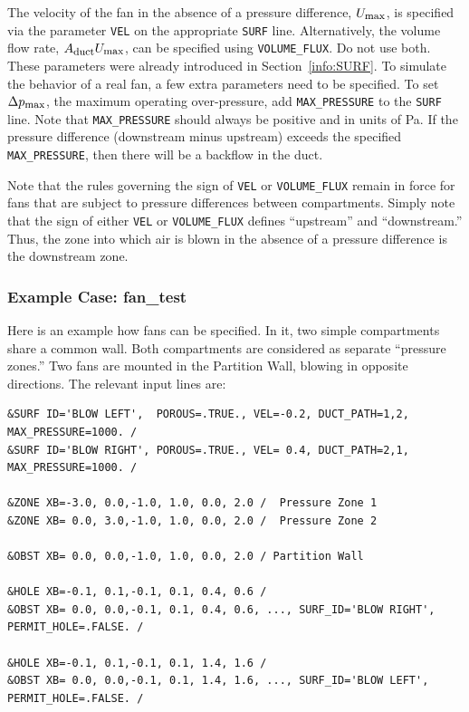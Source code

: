 \documentclass[11pt]{book}
\newcommand{\ct}{\tt\small}
\begin{document}
The velocity of the fan in the absence of a pressure difference, $U_{\hbox{\footnotesize max}}$, is
specified via the parameter {\ct VEL} on the appropriate {\ct SURF}
line. Alternatively, the volume flow rate, $A_{\hbox{\footnotesize duct}} U_{\hbox{\footnotesize max}}$, can be specified using {\ct VOLUME\_FLUX}.
Do not use both.  These parameters were already
introduced in Section~\ref{info:SURF}. To simulate the behavior of a
real fan, a few extra parameters need to be specified. To set $\Delta p_{\hbox{\footnotesize max}}$, the maximum operating over-pressure,
add {\ct MAX\_PRESSURE} to the {\ct SURF} line. Note that {\ct MAX\_PRESSURE}
should always be positive and in units of Pa.  If the pressure difference (downstream minus upstream)
exceeds the specified {\ct MAX\_PRESSURE}, then there will be a backflow in the duct.

\begin{warning}
Note that the rules governing the sign of {\ct VEL} or {\ct VOLUME\_FLUX} remain in force for fans that are subject to pressure differences between
compartments. Simply note that the sign of either {\ct VEL} or {\ct VOLUME\_FLUX}
defines ``upstream'' and ``downstream.'' Thus, the zone into which air is blown in the absence
of a pressure difference is the downstream zone.
\end{warning}

\subsubsection{Example Case: {\bf fan\_test}}

Here is an example how fans can be specified.  In it, two simple
compartments share a common wall. Both compartments are considered as
separate ``pressure zones.'' Two fans are mounted in the Partition
Wall, blowing in opposite directions. The relevant input lines are:

\footnotesize
\begin{verbatim}
&SURF ID='BLOW LEFT',  POROUS=.TRUE., VEL=-0.2, DUCT_PATH=1,2, MAX_PRESSURE=1000. /
&SURF ID='BLOW RIGHT', POROUS=.TRUE., VEL= 0.4, DUCT_PATH=2,1, MAX_PRESSURE=1000. /

&ZONE XB=-3.0, 0.0,-1.0, 1.0, 0.0, 2.0 /  Pressure Zone 1
&ZONE XB= 0.0, 3.0,-1.0, 1.0, 0.0, 2.0 /  Pressure Zone 2

&OBST XB= 0.0, 0.0,-1.0, 1.0, 0.0, 2.0 / Partition Wall

&HOLE XB=-0.1, 0.1,-0.1, 0.1, 0.4, 0.6 /
&OBST XB= 0.0, 0.0,-0.1, 0.1, 0.4, 0.6, ..., SURF_ID='BLOW RIGHT', PERMIT_HOLE=.FALSE. /

&HOLE XB=-0.1, 0.1,-0.1, 0.1, 1.4, 1.6 /
&OBST XB= 0.0, 0.0,-0.1, 0.1, 1.4, 1.6, ..., SURF_ID='BLOW LEFT', PERMIT_HOLE=.FALSE. /
\end{verbatim}
\normalsize
\end{document}
